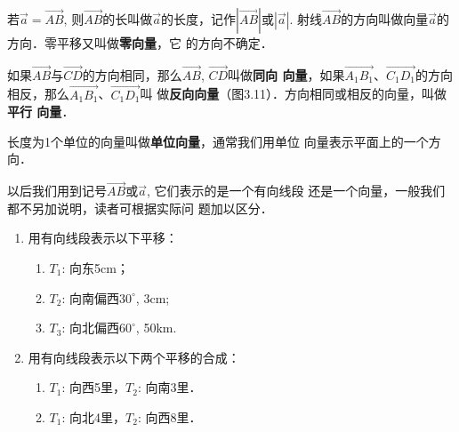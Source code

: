若$\vec{a}=\Vec{AB}$, 则$\Vec{AB}$的长叫做$\vec{a}$的长度，记作$|\Vec{AB}|$或$|\vec{a}|$.
射线$\Vec{AB}$的方向叫做向量$\vec{a}$的方向．零平移又叫做\textbf{零向量}，它
的方向不确定．

如果$\Vec{AB}$与$\Vec{CD}$的方向相同，那么$\Vec{AB}$, $\Vec{CD}$叫做\textbf{同向
向量}，如果$\Vec{A_1B_1}$、$\Vec{C_1D_1}$的方向相反，那么$\Vec{A_1B_1}$、$\Vec{C_1D_1}$叫
做\textbf{反向向量}（图3.11）．方向相同或相反的向量，叫做\textbf{平行
向量}．
\begin{figure}[htp]
    \centering
{}
    \caption{}
\end{figure}

长度为1个单位的向量叫做\textbf{单位向量}，通常我们用单位
向量表示平面上的一个方向．

以后我们用到记号$\Vec{AB}$或$\vec{a}$, 它们表示的是一个有向线段
还是一个向量，一般我们都不另加说明，读者可根据实际问
题加以区分．

\begin{ex}
\begin{enumerate}
    \item 用有向线段表示以下平移：
\begin{enumerate}
    \item $T_1$: 向东5cm；
    \item $T_2$: 向南偏西$30^{\circ}$, 3cm;
    \item $T_3$: 向北偏西$60^{\circ}$, 50km.
\end{enumerate}
\item  用有向线段表示以下两个平移的合成：
\begin{enumerate}
    \item $T_1$: 向西5里，$T_2$: 向南3里．
    \item $T_1$: 向北4里，$T_2$: 向西8里．
\end{enumerate}
\end{enumerate}
\end{ex}

